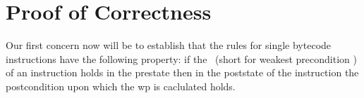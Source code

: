 
\newtheorem{lemma}{Lemma}[section] %
\newtheorem*{vcGenCorrect1}{Theorem  \ref{vcGenCorrect}}
\newcommand{\state}[1]{ \tau_{#1} } 
\newcommand{\straightBraces}[1]{ \texttt{ (} #1 \texttt{ )} }
\newcommand{\tbc}{\textit{TBC}}


\section{Proof of Correctness } \label{proof}


 




Our first concern now will  be to establish that the rules for single bytecode instructions have the following property:
 if the \fwpi \ (short for weakest precondition ) of an 
instruction holds in the prestate then in the poststate of the instruction the postcondition upon which the wp is caclulated holds. 

